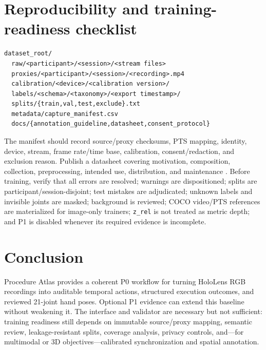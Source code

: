 \documentclass[10pt]{article}
\newcommand{\code}[1]{\texttt{\small #1}}
\begin{document}
\section{Reproducibility and training-readiness checklist}

\begin{verbatim}
dataset_root/
  raw/<participant>/<session>/<stream files>
  proxies/<participant>/<session>/<recording>.mp4
  calibration/<device>/<calibration version>/
  labels/<schema>/<taxonomy>/<export timestamp>/
  splits/{train,val,test,exclude}.txt
  metadata/capture_manifest.csv
  docs/{annotation_guideline,datasheet,consent_protocol}
\end{verbatim}

The manifest should record source/proxy checksums, PTS mapping, identity, device,
stream, frame rate/time base, calibration, consent/redaction, and exclusion
reason. Publish a datasheet covering motivation, composition, collection,
preprocessing, intended use, distribution, and maintenance
\cite{gebru2021datasheets}. Before training, verify that all errors are resolved;
warnings are dispositioned; splits are participant/session-disjoint; test
mistakes are adjudicated; unknown labels and invisible joints are masked;
background is reviewed; COCO video/PTS references are materialized for
image-only trainers; \code{z\_rel} is not treated as metric depth; and P1 is
disabled whenever its required evidence is incomplete.

\section{Conclusion}

Procedure Atlas provides a coherent P0 workflow for turning HoloLens RGB
recordings into auditable temporal actions, structured execution outcomes, and
reviewed 21-joint hand poses. Optional P1 evidence can extend this baseline
without weakening it. The interface and validator are necessary but not
sufficient: training readiness still depends on immutable source/proxy mapping,
semantic review, leakage-resistant splits, coverage analysis, privacy controls,
and---for multimodal or 3D objectives---calibrated synchronization and spatial
annotation.
\end{document}
